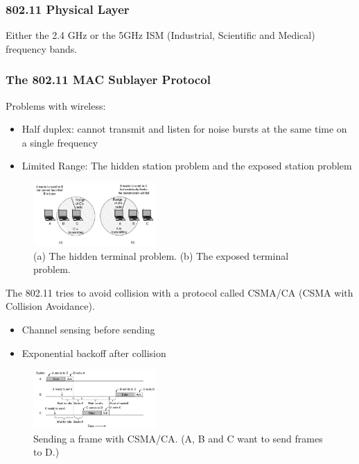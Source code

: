 \subsubsection{802.11 Physical Layer}
Either the 2.4 GHz or the 5GHz ISM (Industrial, Scientific and Medical) frequency bands. 


\subsubsection{The 802.11 MAC Sublayer Protocol}
Problems with wireless:
\begin{itemize}
    \item Half duplex: cannot transmit and listen for noise bursts at the same time on a single frequency
    \item Limited Range: The hidden station problem and the exposed station problem    
\end{itemize}
\begin{figure}[!htb]
    \centering
    \includegraphics[width=0.42\textwidth]{pic/CN4/Problems with wireless}
    \caption{(a) The hidden terminal problem. (b) The exposed terminal problem.}
\end{figure}

The 802.11 tries to avoid collision with a protocol called CSMA/CA (CSMA with Collision Avoidance).
\begin{itemize}
    \item Channel sensing before sending
    \item Exponential backoff after collision
\end{itemize}
\begin{figure}[!htb]
    \centering
    \includegraphics[width=0.42\textwidth]{pic/CN4/Sending a frame with CSMACA}
    \caption{Sending a frame with CSMA/CA. (A, B and C want to send frames to D.)}
\end{figure}


